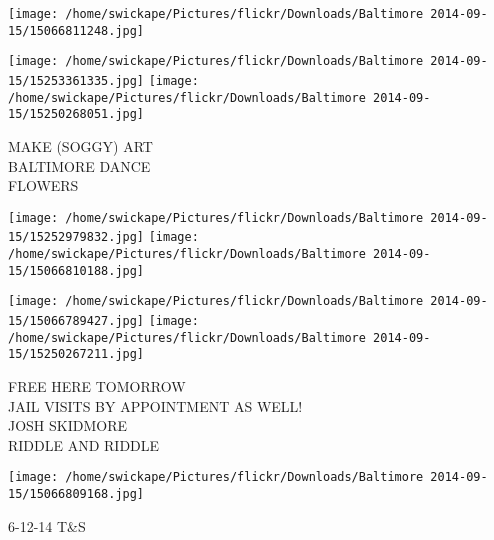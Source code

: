 \documentclass[10pt,letterpaper]{article}
\begin{document}
\texttt{[image: /home/swickape/Pictures/flickr/Downloads/Baltimore 2014-09-15/15066811248.jpg]}

\vspace{0.25in}
\texttt{[image: /home/swickape/Pictures/flickr/Downloads/Baltimore 2014-09-15/15253361335.jpg]}
\texttt{[image: /home/swickape/Pictures/flickr/Downloads/Baltimore 2014-09-15/15250268051.jpg]}

MAKE (SOGGY) ART\\
BALTIMORE DANCE\\
FLOWERS
\pagebreak

\texttt{[image: /home/swickape/Pictures/flickr/Downloads/Baltimore 2014-09-15/15252979832.jpg]}
\texttt{[image: /home/swickape/Pictures/flickr/Downloads/Baltimore 2014-09-15/15066810188.jpg]}

\texttt{[image: /home/swickape/Pictures/flickr/Downloads/Baltimore 2014-09-15/15066789427.jpg]}
\texttt{[image: /home/swickape/Pictures/flickr/Downloads/Baltimore 2014-09-15/15250267211.jpg]}

FREE HERE TOMORROW\\
JAIL VISITS BY APPOINTMENT AS WELL!\\
JOSH SKIDMORE\\
RIDDLE AND RIDDLE
\pagebreak

\texttt{[image: /home/swickape/Pictures/flickr/Downloads/Baltimore 2014-09-15/15066809168.jpg]}

6{-}12{-}14 T\&S
\pagebreak
\end{document}
